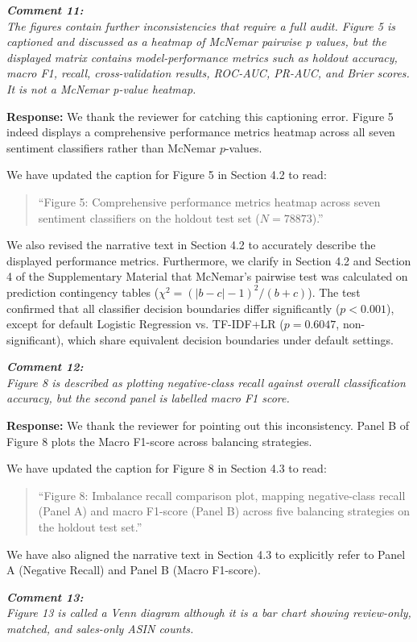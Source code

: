 \documentclass[11pt]{article}
\newcommand{\comment}[1]{\vspace{12pt}\noindent\colorbox{gray!10}{\parbox{\dimexpr\textwidth-2\fboxsep\relax}{\color{commentcolor}\itshape #1}}\vspace{6pt}}
\newcommand{\response}{\vspace{6pt}\noindent\textbf{Response: }}
\newcommand{\update}[1]{\textcolor{updatecolor}{#1}}
\begin{document}
\comment{\textbf{Comment 11:} \\
The figures contain further inconsistencies that require a full audit. Figure 5 is captioned and discussed as a heatmap of McNemar pairwise p values, but the displayed matrix contains model-performance metrics such as holdout accuracy, macro F1, recall, cross-validation results, ROC-AUC, PR-AUC, and Brier scores. It is not a McNemar p-value heatmap.}

\response
We thank the reviewer for catching this captioning error. Figure 5 indeed displays a comprehensive performance metrics heatmap across all seven sentiment classifiers rather than McNemar $p$-values.

We have updated the caption for Figure 5 in Section 4.2 to read:
\begin{quote}
\update{``Figure 5: Comprehensive performance metrics heatmap across seven sentiment classifiers on the holdout test set ($N=78873$).''}
\end{quote}
We also revised the narrative text in Section 4.2 to accurately describe the displayed performance metrics. Furthermore, we clarify in Section 4.2 and Section 4 of the Supplementary Material that McNemar's pairwise test was calculated on prediction contingency tables ($\chi^2 = (|b-c|-1)^2 / (b+c)$). The test confirmed that all classifier decision boundaries differ significantly ($p < 0.001$), except for default Logistic Regression vs. TF-IDF+LR ($p = 0.6047$, non-significant), which share equivalent decision boundaries under default settings.

\comment{\textbf{Comment 12:} \\
Figure 8 is described as plotting negative-class recall against overall classification accuracy, but the second panel is labelled macro F1 score.}

\response
We thank the reviewer for pointing out this inconsistency. Panel B of Figure 8 plots the Macro F1-score across balancing strategies.

We have updated the caption for Figure 8 in Section 4.3 to read:
\begin{quote}
\update{``Figure 8: Imbalance recall comparison plot, mapping negative-class recall (Panel A) and macro F1-score (Panel B) across five balancing strategies on the holdout test set.''}
\end{quote}
We have also aligned the narrative text in Section 4.3 to explicitly refer to Panel A (Negative Recall) and Panel B (Macro F1-score).

\comment{\textbf{Comment 13:} \\
Figure 13 is called a Venn diagram although it is a bar chart showing review-only, matched, and sales-only ASIN counts.}
\end{document}
